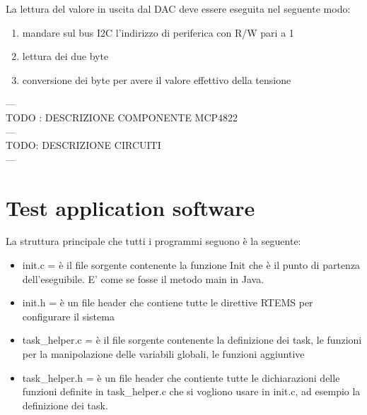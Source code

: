 \documentclass[12pt, a4paper, titlepage, oneside]{book}
\begin{document}
\begin{flushleft}
La lettura del valore in uscita dal DAC deve essere eseguita nel seguente modo:
\begin{enumerate}
    \item mandare sul bus I2C l'indirizzo di periferica con R/W pari a 1
    \item lettura dei due byte
    \item conversione dei byte per avere il valore effettivo della tensione
\end{enumerate}
---\\
TODO : DESCRIZIONE COMPONENTE MCP4822\\
---\\
TODO: DESCRIZIONE CIRCUITI\\
---\\
\section{Test application software}
La struttura principale che tutti i programmi seguono è la seguente:
\begin{itemize}
    \item init.c = è il file sorgente contenente la funzione Init che è il punto di partenza dell'eseguibile. E' come se fosse il metodo main in Java.
    \item init.h = è un file header che contiene tutte le direttive RTEMS per configurare il sistema
    \item task\_helper.c = è il file sorgente contenente la definizione dei task, le funzioni per la manipolazione delle variabili globali, le funzioni aggiuntive 
    \item task\_helper.h = è un file header che contiente tutte le dichiarazioni delle funzioni definite in task\_helper.c che si vogliono usare in init.c, ad esempio la definizione dei task.
\end{itemize}


\end{flushleft}
\end{document}
